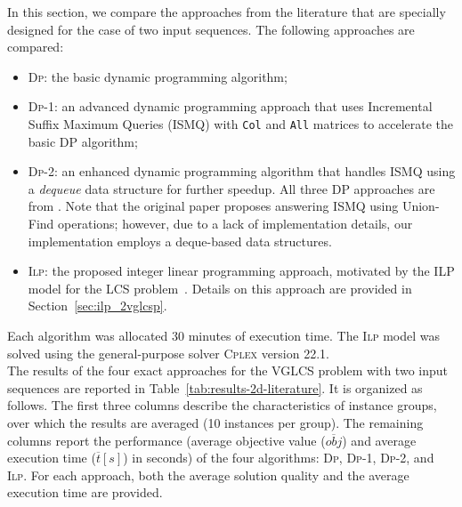 \documentclass[runningheads]{llncs}
\begin{document}
	
	In this section, we compare the approaches from the literature that are specially designed for the case of two input sequences. The following approaches are compared:
	
	\begin{itemize}
		\item \textsc{Dp}: the basic dynamic programming algorithm;
		\item \textsc{Dp}-1: an advanced dynamic programming approach that uses Incremental Suffix Maximum Queries (ISMQ) with \texttt{Col} and \texttt{All} matrices to accelerate the basic DP algorithm;
		\item \textsc{Dp}-2: an enhanced dynamic programming algorithm that handles ISMQ using a \textit{dequeue} data structure for further speedup. All three DP approaches are from \cite{penga2011longest}. Note that the original paper proposes answering ISMQ using Union-Find operations; however, due to a lack of implementation details,  our implementation employs a deque-based data structures.
		\item \textsc{Ilp}: the proposed integer linear programming approach, motivated by the ILP model for the LCS problem~\cite{blum2016metaheuristics}. Details on this approach are provided in Section~\ref{sec:ilp_2vglcsp}. 
		
	\end{itemize}
	
	
	
	Each algorithm was allocated 30 minutes of execution time. The \textsc{Ilp} model was solved using the general-purpose solver \textsc{Cplex} version 22.1. \\
	
	The results of the four exact approaches for the VGLCS problem with two input sequences are reported in Table~\ref{tab:results-2d-literature}. It is organized as follows.  The first three columns describe the characteristics of instance groups, over which the results are averaged (10 instances per group). The remaining columns report the performance (average objective value ($\overline{obj}$) and average execution time ($\overline{t}[s]$) in seconds) of the four algorithms: \textsc{Dp}, \textsc{Dp}-1, \textsc{Dp}-2, and \textsc{Ilp}. For each approach, both the average solution quality and the average execution time are provided.  %
	
\end{document}

